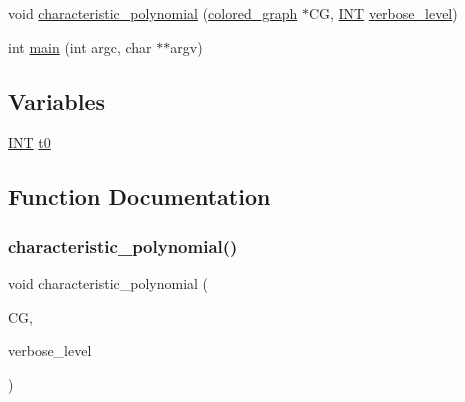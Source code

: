 \begin{DoxyCompactItemize}
\item 
void \mbox{\hyperlink{draw__colored__graph_8_c_a62228dd6db2b90823a89d107af4b5d7a}{characteristic\+\_\+polynomial}} (\mbox{\hyperlink{classcolored__graph}{colored\+\_\+graph}} $\ast$CG, \mbox{\hyperlink{galois_8h_a09fddde158a3a20bd2dcadb609de11dc}{I\+NT}} \mbox{\hyperlink{simeon_8_c_a818073fbcc2f439e7c56952f67386122}{verbose\+\_\+level}})
\item 
int \mbox{\hyperlink{draw__colored__graph_8_c_a3c04138a5bfe5d72780bb7e82a18e627}{main}} (int argc, char $\ast$$\ast$argv)
\end{DoxyCompactItemize}
\subsection*{Variables}
\begin{DoxyCompactItemize}
\item 
\mbox{\hyperlink{galois_8h_a09fddde158a3a20bd2dcadb609de11dc}{I\+NT}} \mbox{\hyperlink{draw__colored__graph_8_c_a4268f4fe222ffb119218a0199f5e1904}{t0}}
\end{DoxyCompactItemize}


\subsection{Function Documentation}
\mbox{\label{draw__colored__graph_8_c_a62228dd6db2b90823a89d107af4b5d7a}} 
\subsubsection{\texorpdfstring{characteristic\+\_\+polynomial()}{characteristic\_polynomial()}}
{\footnotesize\ttfamily void characteristic\+\_\+polynomial (\begin{DoxyParamCaption}\item[{\mbox{\hyperlink{classcolored__graph}{colored\+\_\+graph}} $\ast$}]{CG,  }\item[{\mbox{\hyperlink{galois_8h_a09fddde158a3a20bd2dcadb609de11dc}{I\+NT}}}]{verbose\+\_\+level }\end{DoxyParamCaption})}

\mbox{\label{draw__colored__graph_8_c_a09f78bde7f687bf1bae36dd883bb182a}} 
